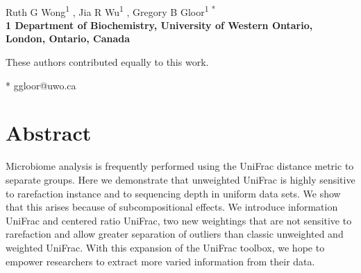 \documentclass[10pt,letterpaper]{article}
\date{}
\begin{document}
\vspace*{0.35in}

\begin{flushleft}
{\Large
\textbf{}
}
\newline
\\
Ruth G Wong\textsuperscript{1 \Yinyang},
Jia R Wu\textsuperscript{1 \Yinyang},
Gregory B Gloor\textsuperscript{1 *}
\\
\bigskip
\bf{1} Department of Biochemistry, University of Western Ontario, London, Ontario, Canada
\\
\bigskip

% 
%
\Yinyang These authors contributed equally to this work.





* ggloor@uwo.ca

\end{flushleft}
\section*{Abstract}
Microbiome analysis is frequently performed using the UniFrac distance metric to separate groups. Here we demonstrate that unweighted UniFrac is highly sensitive to rarefaction instance and to sequencing depth in uniform data sets. We show that this arises because of subcompositional effects. We introduce information UniFrac and centered ratio UniFrac, two new weightings that are not sensitive to rarefaction and allow greater separation of outliers than classic unweighted and weighted UniFrac. With this expansion of the UniFrac toolbox, we hope to empower researchers to extract more varied information from their data.
\end{document}

